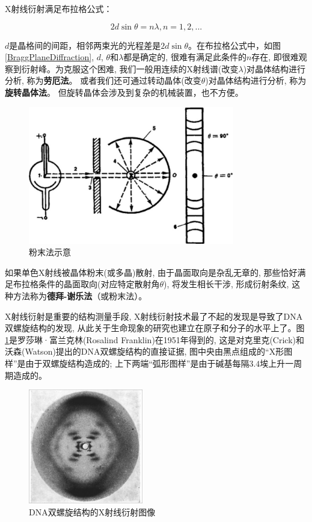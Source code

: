 X射线衍射满足布拉格公式：

\begin{equation}\label{3-1}
2d \sin \theta = n\lambda, n = 1, 2, ...
\end{equation}

$d$是晶格间的间距，相邻两束光的光程差是$2d \sin \theta$。在布拉格公式中，如图\ref{BraggPlaneDiffraction}, $d$,
$\theta$和$\lambda$都是确定的, 很难有满足此条件的$n$存在,
即很难观察到衍射峰。为克服这个困难,
我们一般用连续的X射线谱(改变$\lambda$)对晶体结构进行分析,
称为\textbf{劳厄法}。
或者我们还可通过转动晶体(改变$\theta$)对晶体结构进行分析,
称为\textbf{旋转晶体法}。 但旋转晶体会涉及到复杂的机械装置，也不方便。

\begin{figure}[htbp]
\begin{center}
\includegraphics[width=9cm]{Duality/DebyeScherrer.png}
\caption{粉末法示意}
\end{center}
\end{figure}

如果单色X射线被晶体粉末(或多晶)散射,
由于晶面取向是杂乱无章的,
那些恰好满足布拉格条件的晶面取向(对应特定散射角$\theta$),
将发生相长干涉, 形成衍射条纹, 这种方法称为\textbf{德拜-谢乐法}（或粉末法）。

X射线衍射是重要的结构测量手段,
X射线衍射技术最了不起的发现是导致了DNA双螺旋结构的发现,
从此关于生命现象的研究也建立在原子和分子的水平上了。图\ref{franklin1951}是罗莎琳·富兰克林(Rosalind
Franklin)在1951年得到的,
这是对克里克(Crick)和沃森(Watson)提出的DNA双螺旋结构的直接证据,
图中央由黑点组成的``X形图样''是由于双螺旋结构造成的;
上下两端``弧形图样''是由于碱基每隔$3.4$埃上升一周期造成的。

\begin{figure}[h]
\begin{center}
\includegraphics[width=5cm]{Duality/pbs-photo51.ps}
\caption{DNA双螺旋结构的X射线衍射图像}\label{franklin1951}
\end{center}
\end{figure}

